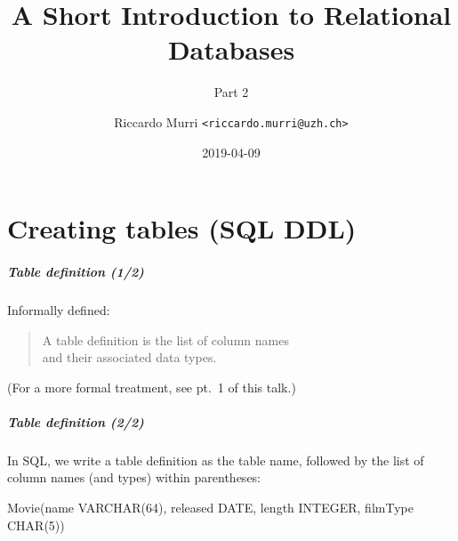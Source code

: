 \documentclass[english,serif,mathserif]{beamer}
\begin{document}
\title[Databases]{A Short Introduction to Relational Databases}
\subtitle{Part 2}
\author{Riccardo Murri \texttt{<riccardo.murri@uzh.ch>}}
\date{2019-04-09}

\maketitle

\part{Creating tables (SQL DDL)}

\begin{frame}[fragile]
  \frametitle{Table definition (1/2)}
  Informally defined:

  \+
  \begin{quote}
    A table definition is the list of column names \\ and their associated data types.
  \end{quote}

  \+
  (For a more formal treatment, see pt.~1 of this talk.)

\end{frame}


\begin{frame}[fragile]
  \frametitle{Table definition (2/2)}

  In SQL, we write a table definition as the table name, followed by the list
  of column names (and types) within parentheses:
  \begin{sql}
    Movie(name VARCHAR(64), released DATE,
          length INTEGER,   filmType CHAR(5))
  \end{sql}
\end{frame}
\end{document}
